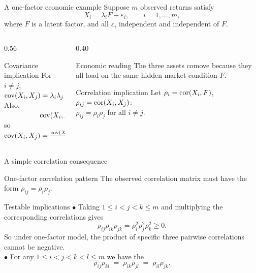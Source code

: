 \documentclass[dvipsnames,aspectratio=169,handout]{beamer}
\begin{document}
\begin{frame}{A one-factor economic example}
Suppose $m$ observed returns satisfy
\[
X_i = \lambda_i F + \varepsilon_i,
\qquad i=1,\ldots,m,
\]
where $F$ is a latent factor, and all $\varepsilon_i$ independent and independent of $F$.
\begin{columns}[T]
\begin{column}{0.56\textwidth}
\begin{block}{Covariance implication}
For $i\neq j$,\\[1mm]
\qquad\qquad\quad$
\operatorname{cov}(X_i,X_j)=\lambda_i\lambda_j\operatorname{var}(F).
$\\
Also,\\[1mm]
$
\qquad\qquad\quad\operatorname{cov}(X_i,F)=\lambda_i\operatorname{var}(F),
$\\
so\\[1mm]
\qquad\qquad\quad$
\operatorname{cov}(X_i,X_j)
=
\frac{\operatorname{cov}(X_i,F)\operatorname{cov}(X_j,F)}{\operatorname{var}(F)}.
$
\end{block}
\end{column}
\begin{column}{0.40\textwidth}
\begin{exampleblock}{Economic reading}
The three assets comove because they all load on the same hidden market condition $F$.
\end{exampleblock}
\begin{alertblock}{Correlation implication}
	Let $\rho_i=\operatorname{cor}(X_i,F)$, $\rho_{ij}=\operatorname{cor}(X_i,X_j)$:\\[1mm]
	\qquad $\rho_{ij}=\rho_i\rho_j$ for all $i\neq j$.
\end{alertblock}
\end{column}
\end{columns}

\end{frame}


\begin{frame}{A simple correlation consequence}

\begin{alertblock}{One-factor correlation pattern}
The observed correlation matrix must have the form $\rho_{ij}=\rho_i\rho_j$.
\end{alertblock}

\begin{block}{Testable implications}
$\bullet$ Taking $1\leq i<j<k\leq m$ and multiplying the corresponding correlations gives
\[
\rho_{ij}\rho_{ik}\rho_{jk}
=
\rho_i^2\rho_j^2\rho_k^2
\ge 0.
\]
So under one-factor model, the product of specific three pairwise correlations cannot be negative.\\[2mm]
$\bullet$ For any $1\leq i<j<k<l\leq m$ we have the 
$$
\rho_{ij}\rho_{kl}\;=\;\rho_{ik}\rho_{jl}\;=\;\rho_{il}\rho_{jk}.
$$
\end{block}
\end{frame}
\end{document}
